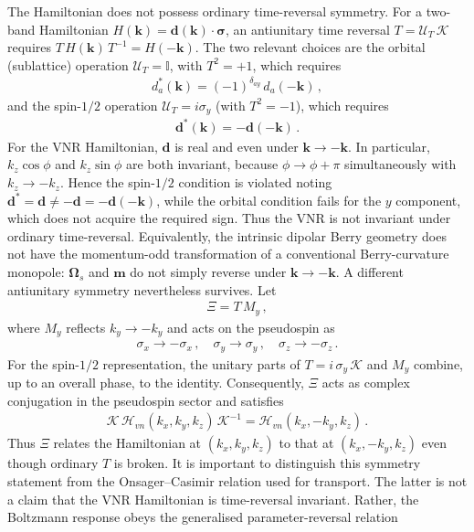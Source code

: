 \documentclass[aps,prb,onecolumn,nofootinbib,citeautoscript,10pt]{revtex4-2}
\newcommand{\bs}[1]{\boldsymbol{#1}}
\begin{document}
The Hamiltonian does not possess ordinary time-reversal symmetry. For a two-band Hamiltonian $H(\bs k)=\bs d(\bs k)\cdot\bs\sigma$, an antiunitary time reversal $T=\mathcal U_T\, \mathcal K$ requires
$T\, H(\bs k)\,T^{-1}=H(-\bs k)$.
The two relevant choices are the orbital (sublattice) operation $\mathcal U_T=\mathbb I$, with $T^2=+1$, which requires
\begin{align}
d_a^*(\bs k)=(-1)^{\delta_{ay}}\, d_a(-\bs k)\,,
\end{align}
and the spin-$1/2$ operation $\mathcal U_T=i\sigma_y$ (with $T^2=-1$), which requires
\begin{align}
\bs d^*(\bs k)=-\bs d(-\bs k)\,.
\end{align}
For the VNR Hamiltonian, $\bs d$ is real and even under $\bs k\to-\bs k$. In particular, $k_z\cos\phi$ and $k_z\sin\phi$ are both invariant, because $\phi\to\phi+\pi$ simultaneously with $k_z\to-k_z$. Hence the spin-$1/2$ condition is violated noting $\bs d^*=\bs d\neq-\bs d=-\bs d(-\bs k)$, while the orbital condition fails for the $y$ component, which does not acquire the required sign. Thus the VNR is not invariant under ordinary time-reversal. Equivalently, the intrinsic dipolar Berry geometry does not have the momentum-odd transformation of a conventional Berry-curvature monopole: $\bs\Omega_s$ and $\boldsymbol m$ do not simply reverse under $\bs k\to-\bs k$. A different antiunitary symmetry nevertheless survives. Let
\begin{align}
\Xi=T \,M_y\,,
\end{align}
where $M_y$ reflects $k_y\to-k_y$ and acts on the pseudospin as
\begin{align}
\sigma_x\to-\sigma_x \,,\quad \sigma_y\to\sigma_y\,,\quad \sigma_z\to-\sigma_z \,.
\end{align}
For the spin-$1/2$ representation, the unitary parts of $T=i\,\sigma_y \,\mathcal K$ and $M_y$ combine, up to an overall phase, to the identity. Consequently, $\Xi$ acts as complex conjugation in the pseudospin sector and satisfies
\begin{align}
\label{eq:xi_invariance_vnr}
\mathcal K\,\mathcal H_{vn}(k_x,k_y,k_z)\,\mathcal K^{-1} = \mathcal H_{vn}(k_x,-k_y,k_z)\,.
\end{align}
Thus $\Xi$ relates the Hamiltonian at $(k_x,k_y,k_z)$ to that at $(k_x,-k_y,k_z)$ even though ordinary $T$ is broken. It is important to distinguish this symmetry statement from the Onsager--Casimir relation used for transport. The latter is not a claim that the VNR Hamiltonian is time-reversal invariant. Rather, the Boltzmann response obeys the generalised parameter-reversal relation
\end{document}
